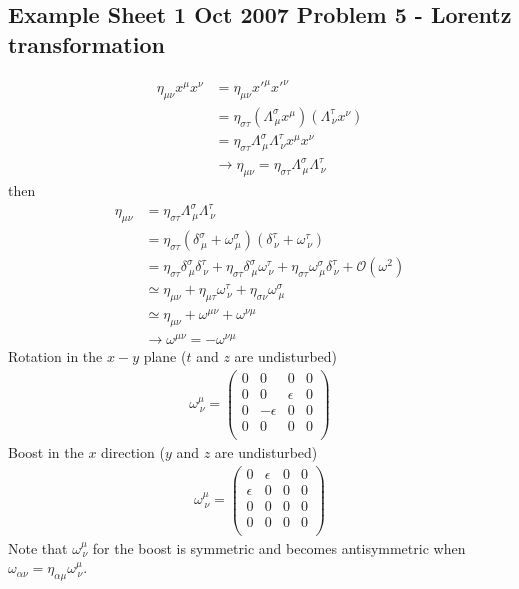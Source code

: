 \documentclass[10pt,a4paper]{book}
\theoremstyle{definition}
\begin{document}
\subsection{Example Sheet 1 Oct 2007 Problem 5 - Lorentz transformation}
\begin{align}
\eta_{\mu\nu}x^\mu x^\nu
&=\eta_{\mu\nu}x'^\mu x'^\nu\\
&=\eta_{\sigma\tau}(\Lambda^\sigma_{\,\mu}x^\mu)(\Lambda^\tau_{\,\nu}x^\nu)\\
&=\eta_{\sigma\tau}\Lambda^\sigma_{\,\mu}\Lambda^\tau_{\,\nu}x^\mu x^\nu\\
&\rightarrow \eta_{\mu\nu}=\eta_{\sigma\tau}\Lambda^\sigma_{\,\mu}\Lambda^\tau_{\,\nu}
\end{align}
then
\begin{align}
\eta_{\mu\nu}
&=\eta_{\sigma\tau}\Lambda^\sigma_{\,\mu}\Lambda^\tau_{\,\nu}\\
&=\eta_{\sigma\tau}(\delta^\sigma_{\,\mu}+\omega^\sigma_{\,\mu})(\delta^\tau_{\,\nu}+\omega^\tau_{\,\nu})\\
&=\eta_{\sigma\tau}\delta^\sigma_{\,\mu}\delta^\tau_{\,\nu}
+\eta_{\sigma\tau}\delta^\sigma_{\,\mu}\omega^\tau_{\,\nu}
+\eta_{\sigma\tau}\omega^\sigma_{\,\mu}\delta^\tau_{\,\nu}+\mathcal{O}(\omega^2)\\
&\simeq\eta_{\mu\nu}+\eta_{\mu\tau}\omega^\tau_{\,\nu}+\eta_{\sigma\nu}\omega^\sigma_{\,\mu}\\
&\simeq\eta_{\mu\nu}+\omega^{\mu\nu}+\omega^{\nu\mu}\\
&\rightarrow\omega^{\mu\nu}=-\omega^{\nu\mu}
\end{align}
Rotation in the $x-y$ plane ($t$ and $z$ are undisturbed)
\begin{align}
\omega^\mu_{\,\nu}=
\left(
\begin{matrix}
0 & 0 & 0 & 0\\
0 & 0 & \epsilon & 0\\
0 & -\epsilon & 0 & 0\\
0 & 0 & 0 & 0\\
\end{matrix}
\right)
\end{align}
Boost in the $x$ direction ($y$ and $z$ are undisturbed)
\begin{align}
\omega^\mu_{\,\nu}=
\left(
\begin{matrix}
0 & \epsilon & 0 & 0\\
\epsilon & 0 & 0 & 0\\
0 & 0 & 0 & 0\\
0 & 0 & 0 & 0\\
\end{matrix}
\right)
\end{align}
Note that $\omega^\mu_{\,\nu}$ for the boost is symmetric and becomes antisymmetric when $\omega_{\alpha\nu}=\eta_{\alpha\mu}\omega^\mu_{\,\nu}$.
\end{document}
